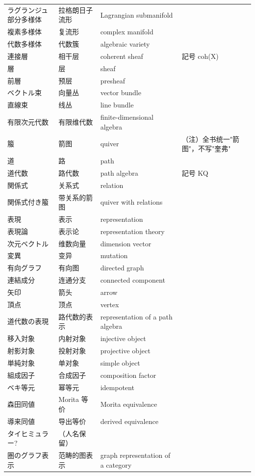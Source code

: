 \begin{longtable}{p{}p{}p{}p{}}
ラグランジュ部分多様体 & 拉格朗日子流形 & Lagrangian submanifold &  \\
複素多様体 & 复流形 & complex manifold &  \\
代数多様体 & 代数簇 & algebraic variety &  \\
連接層 & 相干层 & coherent sheaf & 記号 coh(X) \\
層 & 层 & sheaf &  \\
前層 & 预层 & presheaf &  \\
ベクトル束 & 向量丛 & vector bundle &  \\
直線束 & 线丛 & line bundle &  \\
有限次元代数 & 有限维代数 & finite-dimensional algebra &  \\
箙 & 箭图 & quiver & （注）全书统一"箭图"，不写"奎弗" \\
道 & 路 & path &  \\
道代数 & 路代数 & path algebra & 記号 KQ \\
関係式 & 关系式 & relation &  \\
関係式付き箙 & 带关系的箭图 & quiver with relations &  \\
表現 & 表示 & representation &  \\
表現論 & 表示论 & representation theory &  \\
次元ベクトル & 维数向量 & dimension vector &  \\
変異 & 变异 & mutation &  \\
有向グラフ & 有向图 & directed graph &  \\
連結成分 & 连通分支 & connected component &  \\
矢印 & 箭头 & arrow &  \\
頂点 & 顶点 & vertex &  \\
道代数の表現 & 路代数的表示 & representation of a path algebra &  \\
移入対象 & 内射对象 & injective object &  \\
射影対象 & 投射对象 & projective object &  \\
単純対象 & 单对象 & simple object &  \\
組成因子 & 合成因子 & composition factor &  \\
ベキ等元 & 幂等元 & idempotent &  \\
森田同値 & Morita 等价 & Morita equivalence &  \\
導来同値 & 导出等价 & derived equivalence &  \\
タイヒミュラー? & （人名保留） &  &  \\
圏のグラフ表示 & 范畴的图表示 & graph representation of a category &  \\

\end{longtable}

